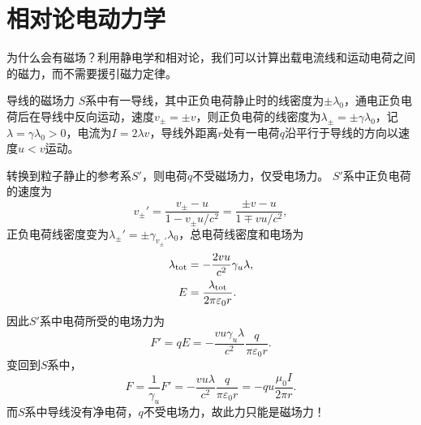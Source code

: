 \section{相对论电动力学}
为什么会有磁场？利用静电学和相对论，我们可以计算出载电流线和运动电荷之间的磁力，而不需要援引磁力定律。
\begin{example}{导线的磁场力}{}
    $S$系中有一导线，其中正负电荷静止时的线密度为$\pm\lambda_0$，通电正负电荷后在导线中反向运动，速度$v_\pm = \pm v$，则正负电荷的线密度为$\lambda_\pm = \pm\gamma\lambda_0$，记$\lambda = \gamma\lambda_0 > 0$，电流为$I = 2\lambda v$，导线外距离$r$处有一电荷$q$沿平行于导线的方向以速度$u < v$运动。

    \begin{notecaptionblock}
    \end{notecaptionblock}
    转换到粒子静止的参考系$S'$，则电荷$q$不受磁场力，仅受电场力。
    $S'$系中正负电荷的速度为
    \[
        v_\pm' = \frac{v_\pm - u}{1 - v_\pm u/c^2} = \frac{\pm v - u}{1 \mp vu/c^2},
    \]
    正负电荷线密度变为$\lambda_\pm' = \pm\gamma_{v_\pm'}\lambda_0$，总电荷线密度和电场为
    \begin{align*}
        \lambda_{\mathrm{tot}} &= -\frac{2vu}{c^2}\gamma_u\lambda,\\
        E &= \frac{\lambda_{\mathrm{tot}}}{2\pi\varepsilon_0r}.
    \end{align*}
    因此$S'$系中电荷所受的电场力为
    \[
        F' = qE = -\frac{vu\gamma_u\lambda}{c^2}\frac q{\pi\varepsilon_0r}.
    \]
    变回到$S$系中，
    \[
        F = \frac1{\gamma_u}F' = -\frac{vu\lambda}{c^2}\frac q{\pi\varepsilon_0r} = -qu\frac{\mu_0I}{2\pi r}.
    \]
    而$S$系中导线没有净电荷，$q$不受电场力，故此力只能是磁场力！
\end{example}
